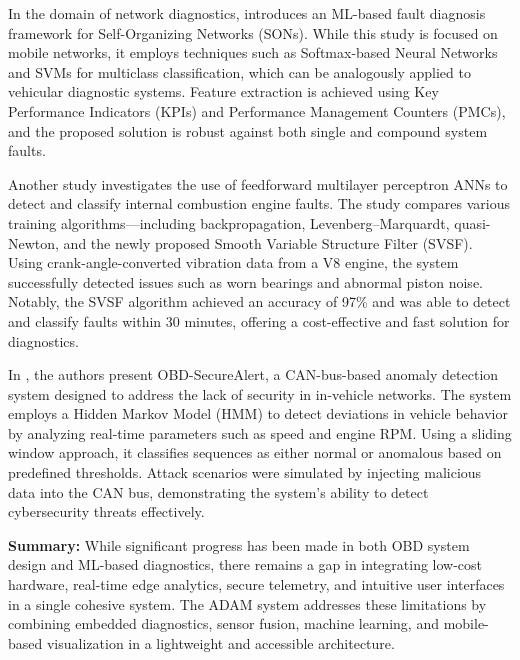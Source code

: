 In the domain of network diagnostics, \cite{b5} introduces an ML-based fault diagnosis framework for Self-Organizing Networks (SONs). While this study is focused on mobile networks, it employs techniques such as Softmax-based Neural Networks and SVMs for multiclass classification, which can be analogously applied to vehicular diagnostic systems. Feature extraction is achieved using Key Performance Indicators (KPIs) and Performance Management Counters (PMCs), and the proposed solution is robust against both single and compound system faults.

Another study \cite{b6} investigates the use of feedforward multilayer perceptron ANNs to detect and classify internal combustion engine faults. The study compares various training algorithms—including backpropagation, Levenberg–Marquardt, quasi-Newton, and the newly proposed Smooth Variable Structure Filter (SVSF). Using crank-angle-converted vibration data from a V8 engine, the system successfully detected issues such as worn bearings and abnormal piston noise. Notably, the SVSF algorithm achieved an accuracy of 97\% and was able to detect and classify faults within 30 minutes, offering a cost-effective and fast solution for diagnostics.

In \cite{b7}, the authors present OBD-SecureAlert, a CAN-bus-based anomaly detection system designed to address the lack of security in in-vehicle networks. The system employs a Hidden Markov Model (HMM) to detect deviations in vehicle behavior by analyzing real-time parameters such as speed and engine RPM. Using a sliding window approach, it classifies sequences as either normal or anomalous based on predefined thresholds. Attack scenarios were simulated by injecting malicious data into the CAN bus, demonstrating the system's ability to detect cybersecurity threats effectively.

\textbf{Summary:} While significant progress has been made in both OBD system design and ML-based diagnostics, there remains a gap in integrating low-cost hardware, real-time edge analytics, secure telemetry, and intuitive user interfaces in a single cohesive system. The ADAM system addresses these limitations by combining embedded diagnostics, sensor fusion, machine learning, and mobile-based visualization in a lightweight and accessible architecture.




